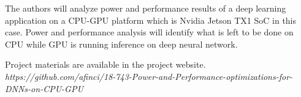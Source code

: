 The authors will analyze power and performance results of a deep learning application on a CPU-GPU platform which is Nvidia Jetson TX1 SoC in this case. Power and performance analysis will identify what is left to be done on CPU while GPU is running inference on deep neural network.

Project materials are available in the project website. \textit{https://github.com/afinci/18-743-Power-and-Performance-optimizations-for-DNNs-on-CPU-GPU}